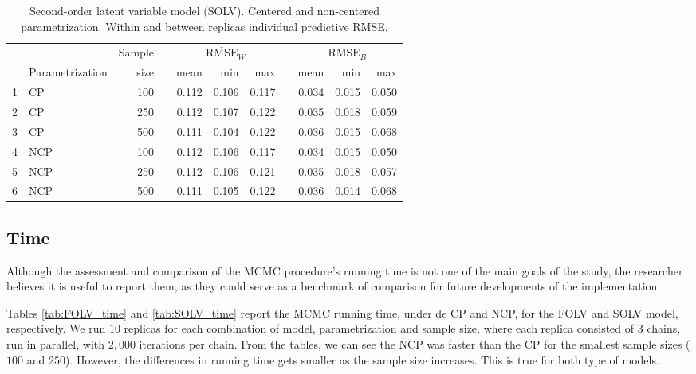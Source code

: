 \begin{table}[H]
	\centering
	\begin{tabular}{rlrrrrrrrrr}
		\hline
		&  & Sample && \multicolumn{3}{c}{ $\overline{\text{RMSE}}_{W}$ } && \multicolumn{3}{c}{ $\text{RMSE}_{B}$ } \\
		\cmidrule(rl){5-7} \cmidrule(rl){9-11}  
		& Parametrization & size  && mean & min & max && mean & min & max \\ 
		\hline\hline
		1 & CP & 100 && 0.112 & 0.106 & 0.117 && 0.034 & 0.015 & 0.050 \\ 
		2 & CP & 250 && 0.112 & 0.107 & 0.122 && 0.035 & 0.018 & 0.059 \\ 
		3 & CP & 500 && 0.111 & 0.104 & 0.122 && 0.036 & 0.015 & 0.068 \\ 
		\hline
		4 & NCP & 100 && 0.112 & 0.106 & 0.117 && 0.034 & 0.015 & 0.050 \\
		5 & NCP & 250 && 0.112 & 0.106 & 0.121 && 0.035 & 0.018 & 0.057 \\
		6 & NCP & 500 && 0.111 & 0.105 & 0.122 && 0.036 & 0.014 & 0.068 \\ 
		\hline
	\end{tabular}
	\caption[Second-order latent variable model (SOLV). Centered and non-centered parametrization. Within and between replicas individual predictive RMSE.]%
	{Second-order latent variable model (SOLV). Centered and non-centered parametrization. Within and between replicas individual predictive RMSE.}
	\label{tab:SOLV_accuracy}
\end{table}




\subsection{Time}

Although the assessment and comparison of the MCMC procedure's running time is not one of the main goals of the study, the researcher believes it is useful to report them, as they could serve as a benchmark of comparison for future developments of the implementation.

Tables \ref{tab:FOLV_time} and \ref{tab:SOLV_time} report the MCMC running time, under de CP and NCP, for the FOLV and SOLV model, respectively. We run $10$ replicas for each combination of model, parametrization and sample size, where each replica consisted of $3$ chains, run in parallel, with $2,000$ iterations per chain. From the tables, we can see the NCP was faster than the CP for the smallest sample sizes ($100$ and $250$).  However, the differences in running time gets smaller as the sample size increases. This is true for both type of models. 

